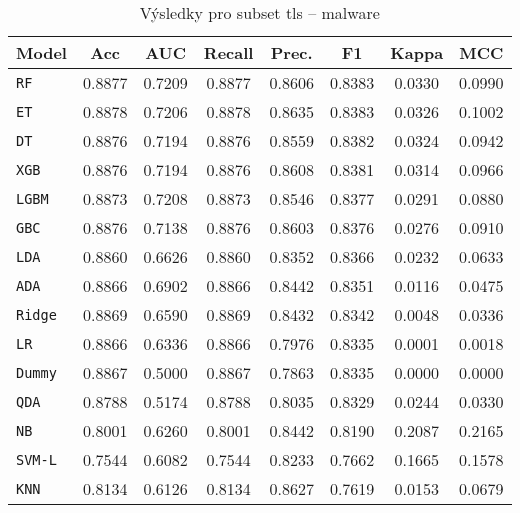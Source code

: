 \begin{table}[H]
  \centering
  \small
  \caption{Výsledky pro subset tls – malware}
  \begin{tabular}{|l|c|c|c|c|c|c|c|}
    \hline
    \textbf{Model} & \textbf{Acc} & \textbf{AUC} & \textbf{Recall} & \textbf{Prec.} & \textbf{F1} & \textbf{Kappa} & \textbf{MCC} \\
    \hline
    \texttt{RF} & 0.8877 & 0.7209 & 0.8877 & 0.8606 & 0.8383 & 0.0330 & 0.0990 \\
    \texttt{ET} & 0.8878 & 0.7206 & 0.8878 & 0.8635 & 0.8383 & 0.0326 & 0.1002 \\
    \texttt{DT} & 0.8876 & 0.7194 & 0.8876 & 0.8559 & 0.8382 & 0.0324 & 0.0942 \\
    \texttt{XGB} & 0.8876 & 0.7194 & 0.8876 & 0.8608 & 0.8381 & 0.0314 & 0.0966 \\
    \texttt{LGBM} & 0.8873 & 0.7208 & 0.8873 & 0.8546 & 0.8377 & 0.0291 & 0.0880 \\
    \texttt{GBC} & 0.8876 & 0.7138 & 0.8876 & 0.8603 & 0.8376 & 0.0276 & 0.0910 \\
    \texttt{LDA} & 0.8860 & 0.6626 & 0.8860 & 0.8352 & 0.8366 & 0.0232 & 0.0633 \\
    \texttt{ADA} & 0.8866 & 0.6902 & 0.8866 & 0.8442 & 0.8351 & 0.0116 & 0.0475 \\
    \texttt{Ridge} & 0.8869 & 0.6590 & 0.8869 & 0.8432 & 0.8342 & 0.0048 & 0.0336 \\
    \texttt{LR} & 0.8866 & 0.6336 & 0.8866 & 0.7976 & 0.8335 & 0.0001 & 0.0018 \\
    \texttt{Dummy} & 0.8867 & 0.5000 & 0.8867 & 0.7863 & 0.8335 & 0.0000 & 0.0000 \\
    \texttt{QDA} & 0.8788 & 0.5174 & 0.8788 & 0.8035 & 0.8329 & 0.0244 & 0.0330 \\
    \texttt{NB} & 0.8001 & 0.6260 & 0.8001 & 0.8442 & 0.8190 & 0.2087 & 0.2165 \\
    \texttt{SVM-L} & 0.7544 & 0.6082 & 0.7544 & 0.8233 & 0.7662 & 0.1665 & 0.1578 \\
    \texttt{KNN} & 0.8134 & 0.6126 & 0.8134 & 0.8627 & 0.7619 & 0.0153 & 0.0679 \\
    \hline
  \end{tabular}
\end{table}
\vspace{0.5cm}

